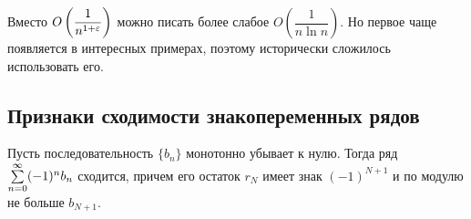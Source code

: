 \begin{Comment}
Вместо $O\left(\dfrac{1}{n^{1+\varepsilon}} \right)$ можно писать более слабое $O\left(
\dfrac{1}{n\ln n} \right)$. Но первое чаще появляется в интересных примерах, поэтому исторически сложилось использовать его.
\end{Comment}

\subsection{Признаки сходимости знакопеременных рядов}
\begin{Test}
Пусть последовательность $\{b_n\}$ монотонно убывает к нулю. Тогда ряд $\sum\limits_{n=0}^{\infty}(-1)^nb_n$ сходится, причем его остаток $r_N$ имеет знак $(-1)^{N+1}$ и по модулю не больше $b_{N+1}$.
\end{Test}
